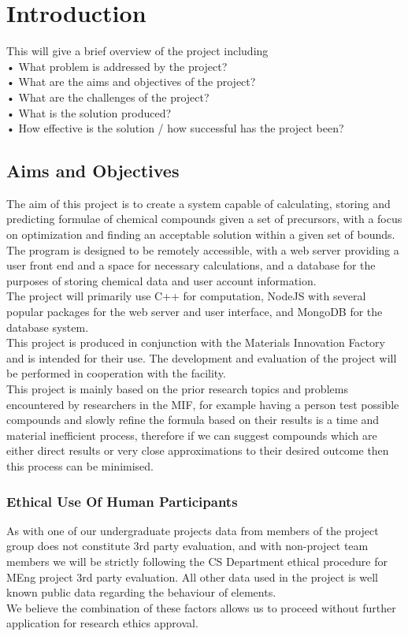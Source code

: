 \chapter{Introduction}
\label{ch:intro}

This will give a brief overview of the project including\\
• What problem is addressed by the project?\\
• What are the aims and objectives of the project?\\
• What are the challenges of the project?\\
• What is the solution produced?\\
• How effective is the solution / how successful has the project been?\\

\section{Aims and Objectives}
The aim of this project is to create a system capable of calculating, storing and predicting formulae of chemical compounds given a set of precursors, with a focus on optimization and finding an acceptable solution within a given set of bounds. The program is designed to be remotely accessible, with a web server providing a user front end and a space for necessary calculations, and a database for the purposes of storing chemical data and user account information. \\

The project will primarily use C++ for computation, NodeJS with several popular packages for the web server and user interface, and MongoDB for the database system. \\

This project is produced in conjunction with the Materials Innovation Factory and is intended for their use. The development and evaluation of the project will be performed in cooperation with the facility. \\

This project is mainly based on the prior research topics and problems encountered by researchers in the MIF, for example having a person test possible compounds and slowly refine the formula based on their results is a time and material inefficient process, therefore if we can suggest compounds which are either direct results or very close approximations to their desired outcome then this process can be minimised. \\

\subsection{Ethical Use Of Human Participants}
As with one of our undergraduate projects data from members of the project group does not constitute 3rd party evaluation, and with non-project team members we will be strictly following the CS Department ethical procedure for MEng project 3rd party evaluation. All other data used in the project is well known public data regarding the behaviour of elements. \\

We believe the combination of these factors allows us to proceed without further application for research ethics approval.